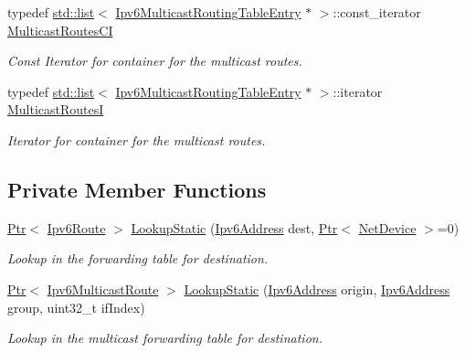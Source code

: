 \begin{DoxyCompactItemize}
typedef \hyperlink{openflow-interface_8h_afd9bcfa176617760671b67580f536fa7}{std\+::list}$<$ \hyperlink{classns3_1_1Ipv6MulticastRoutingTableEntry}{Ipv6\+Multicast\+Routing\+Table\+Entry} $\ast$ $>$\+::const\+\_\+iterator \hyperlink{classns3_1_1Ipv6StaticRouting_a92c49caeb07b0d87fc1945a828ba33eb}{Multicast\+Routes\+CI}
\begin{DoxyCompactList}\small\item\em Const Iterator for container for the multicast routes. \end{DoxyCompactList}\item 
typedef \hyperlink{openflow-interface_8h_afd9bcfa176617760671b67580f536fa7}{std\+::list}$<$ \hyperlink{classns3_1_1Ipv6MulticastRoutingTableEntry}{Ipv6\+Multicast\+Routing\+Table\+Entry} $\ast$ $>$\+::iterator \hyperlink{classns3_1_1Ipv6StaticRouting_aed9967a6ba9f015a1812644f7b2cde1f}{Multicast\+RoutesI}
\begin{DoxyCompactList}\small\item\em Iterator for container for the multicast routes. \end{DoxyCompactList}\end{DoxyCompactItemize}
\subsection*{Private Member Functions}
\begin{DoxyCompactItemize}
\item 
\hyperlink{classns3_1_1Ptr}{Ptr}$<$ \hyperlink{classns3_1_1Ipv6Route}{Ipv6\+Route} $>$ \hyperlink{classns3_1_1Ipv6StaticRouting_a53cafb0907cefabca6894c9d4dc6c154}{Lookup\+Static} (\hyperlink{classns3_1_1Ipv6Address}{Ipv6\+Address} dest, \hyperlink{classns3_1_1Ptr}{Ptr}$<$ \hyperlink{classns3_1_1NetDevice}{Net\+Device} $>$=0)
\begin{DoxyCompactList}\small\item\em Lookup in the forwarding table for destination. \end{DoxyCompactList}\item 
\hyperlink{classns3_1_1Ptr}{Ptr}$<$ \hyperlink{classns3_1_1Ipv6MulticastRoute}{Ipv6\+Multicast\+Route} $>$ \hyperlink{classns3_1_1Ipv6StaticRouting_aad420be705ea418cc3c0481e751d9094}{Lookup\+Static} (\hyperlink{classns3_1_1Ipv6Address}{Ipv6\+Address} origin, \hyperlink{classns3_1_1Ipv6Address}{Ipv6\+Address} group, uint32\+\_\+t if\+Index)
\begin{DoxyCompactList}\small\item\em Lookup in the multicast forwarding table for destination. \end{DoxyCompactList}\end{DoxyCompactItemize}
